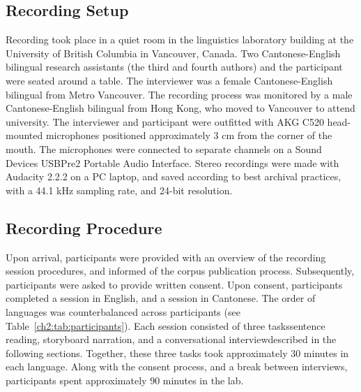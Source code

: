 \subsection{Recording Setup}\label{ch2:subsec:setup}
Recording took place in a quiet room in the linguistics laboratory building at the University of British Columbia in Vancouver, Canada. Two Cantonese-English bilingual research assistants (the third and fourth authors) and the participant were seated around a table. The interviewer was a female Cantonese-English bilingual from Metro Vancouver. The recording process was monitored by a male Cantonese-English bilingual from Hong Kong, who moved to Vancouver to attend university. The interviewer and participant were outfitted with AKG C520 head-mounted microphones positioned approximately 3 cm from the corner of the mouth. The microphones were connected to separate channels on a Sound Devices USBPre2 Portable Audio Interface. Stereo recordings were made with Audacity 2.2.2 \citep{audacity_2018_audio} on a PC laptop, and saved according to best archival practices, with a 44.1 kHz sampling rate, and 24-bit resolution.

\subsection{Recording Procedure}\label{ch2:subsec:procedure}
Upon arrival, participants were provided with an overview of the recording session procedures, and informed of the corpus publication process. Subsequently, participants were asked to provide written consent. Upon consent, participants completed a session in English, and a session in Cantonese. The order of languages was counterbalanced across participants (see Table~\ref{ch2:tab:participants}). Each session consisted of three tasks\textemdash sentence reading, storyboard narration, and a conversational interview\textemdash described in the following sections. Together, these three tasks took approximately 30 minutes in each language. Along with the consent process, and a break between interviews, participants spent approximately 90 minutes in the lab.

